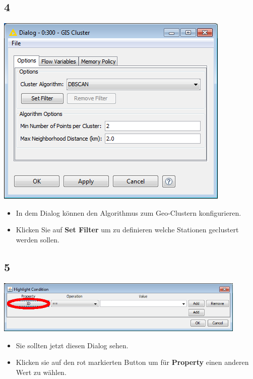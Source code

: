 \documentclass{beamer}
\begin{document}
\subsection{4}
\begin{frame}
	\begin{center}
  		\includegraphics[height=0.6\textheight]{4.png}
	\end{center}
	\begin{itemize}
		\item In dem Dialog können den Algorithmus zum Geo-Clustern konfigurieren.
		\item Klicken Sie auf \textbf{Set Filter} um zu definieren welche Stationen geclustert werden sollen.
	\end{itemize}
\end{frame}

\subsection{5}
\begin{frame}
	\begin{center}
  		\includegraphics[width=0.9\textwidth]{5.png}
	\end{center}
	\begin{itemize}
		\item Sie sollten jetzt diesen Dialog sehen.
		\item Klicken sie auf den rot markierten Button um für \textbf{Property} einen anderen Wert zu wählen.
	\end{itemize}
\end{frame}
\end{document}
